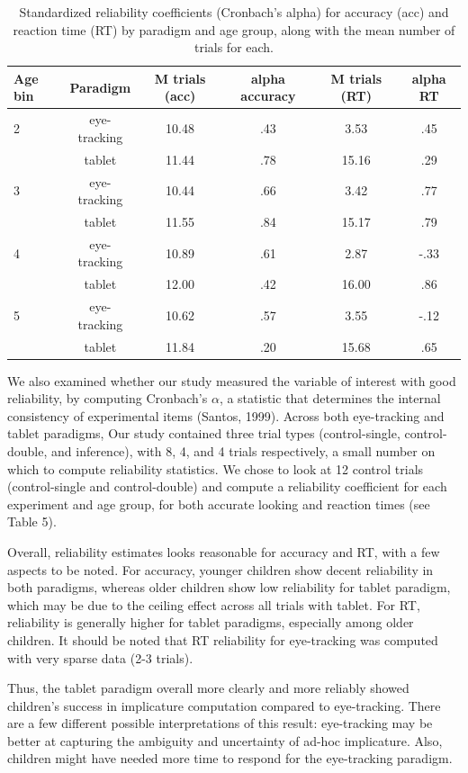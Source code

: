 \documentclass[a4paper,man,apacite,floatsintext]{apa6}
\begin{document}
\begin{table}[tb]
\centering
\begin{tabular}{lccccc}
 Age bin & Paradigm & M trials (acc) & alpha accuracy & M trials (RT) & alpha RT \\ 
  \hline
2 & eye-tracking & 10.48 & .43 & 3.53 & .45 \\ 
    & tablet & 11.44 & .78 & 15.16 & .29 \\ 
  3 & eye-tracking & 10.44 & .66 & 3.42 & .77 \\ 
    & tablet & 11.55 & .84 & 15.17 & .79 \\ 
  4 & eye-tracking & 10.89 & .61 & 2.87 & -.33 \\ 
    & tablet & 12.00 & .42 & 16.00 & .86 \\ 
  5 & eye-tracking & 10.62 & .57 & 3.55 & -.12 \\ 
    & tablet & 11.84 & .20 & 15.68 & .65 \\ 
   \hline
\end{tabular}
\caption{Standardized reliability coefficients (Cronbach's alpha) for accuracy (acc) and reaction time (RT) by paradigm and age group, along with the mean number of trials for each.} 
\label{tab:etip_rel}
\end{table}

We also examined whether our study measured the variable of interest
with good reliability, by computing Cronbach's \(\alpha\), a statistic
that determines the internal consistency of experimental items (Santos,
1999). Across both eye-tracking and tablet paradigms, Our study
contained three trial types (control-single, control-double, and
inference), with 8, 4, and 4 trials respectively, a small number on
which to compute reliability statistics. We chose to look at 12 control
trials (control-single and control-double) and compute a reliability
coefficient for each experiment and age group, for both accurate looking
and reaction times (see Table 5).

Overall, reliability estimates looks reasonable for accuracy and RT,
with a few aspects to be noted. For accuracy, younger children show
decent reliability in both paradigms, whereas older children show low
reliability for tablet paradigm, which may be due to the ceiling effect
across all trials with tablet. For RT, reliability is generally higher
for tablet paradigms, especially among older children. It should be
noted that RT reliability for eye-tracking was computed with very sparse
data (2-3 trials).

Thus, the tablet paradigm overall more clearly and more reliably showed
children's success in implicature computation compared to eye-tracking.
There are a few different possible interpretations of this result:
eye-tracking may be better at capturing the ambiguity and uncertainty of
ad-hoc implicature. Also, children might have needed more time to
respond for the eye-tracking paradigm.
\end{document}
